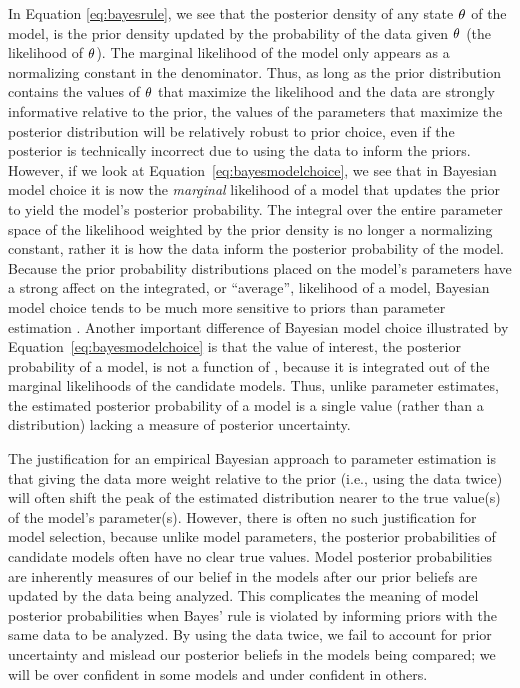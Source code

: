 In Equation \ref{eq:bayesrule}, we see that the posterior density of any state
$\theta_{}$ of the model, is the prior density updated by the probability of
the data given $\theta_{}$ (the likelihood of $\theta_{}$).
The marginal likelihood of the model only appears as a normalizing constant in
the denominator.
Thus, as long as the prior distribution contains the values of $\theta_{}$
that maximize the likelihood and the data are strongly informative
relative to the prior, the values of the parameters that maximize the posterior
distribution will be relatively robust to prior choice, even if the posterior
is technically incorrect due to using the data to inform the priors.
However, if we look at Equation~\ref{eq:bayesmodelchoice}, we see that in
Bayesian model choice it is now the \emph{marginal} likelihood of a model that
updates the prior to yield the model's posterior probability.
The integral over the entire parameter space of the likelihood weighted by the
prior density is no longer a normalizing constant, rather it is how the data
inform the posterior probability of the model.
Because the prior probability distributions placed on the model's parameters
have a strong affect on the integrated, or ``average'', likelihood of a model,
Bayesian model choice tends to be much more sensitive to priors than parameter
estimation \citep{Jeffreys1939,Lindley1957}.
Another important difference of Bayesian model choice illustrated by
Equation~\ref{eq:bayesmodelchoice} is that the value of interest, the
posterior probability of a model, is not a function of \myTheta{}, because
it is integrated out of the marginal likelihoods of the candidate models.
Thus, unlike parameter estimates, the estimated posterior probability of a
model is a single value (rather than a distribution) lacking a measure of
posterior uncertainty.

The justification for an empirical Bayesian approach to parameter estimation is
that giving the data more weight relative to the prior (i.e., using the data
twice) will often shift the peak of the estimated distribution nearer to the
true value(s) of the model's parameter(s).
However, there is often no such justification for model selection, because
unlike model parameters, the posterior probabilities of candidate models often
have no clear true values.
Model posterior probabilities are inherently measures of our belief in the
models after our prior beliefs are updated by the data being analyzed.
This complicates the meaning of model posterior probabilities when Bayes' rule
is violated by informing priors with the same data to be analyzed.
By using the data twice, we fail to account for prior uncertainty and mislead
our posterior beliefs in the models being compared; we will be over confident
in some models and under confident in others.


